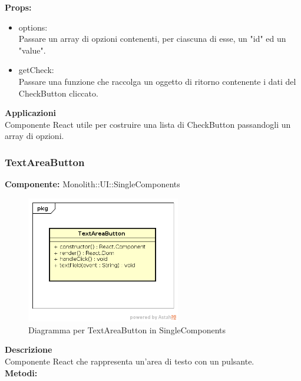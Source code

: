 \textbf{Props:} 
\begin{itemize}
\item options: 
\\
Passare un array di opzioni contenenti, per ciascuna di esse, un "id" ed un "value".
\item getCheck: 
\\
Passare una funzione che raccolga un oggetto di ritorno contenente i dati del CheckButton cliccato.

\end{itemize} 


\textbf{Applicazioni}\\
Componente React utile per costruire una lista di CheckButton passandogli un array di opzioni. 


\clearpage

\subsubsection{TextAreaButton}
\textbf{Componente:}  Monolith::UI::SingleComponents\\
   \FloatBarrier
   \begin{figure}[ht]
   \centering
   \includegraphics[width=0.6\textwidth]{img/single-TextAreaButton.png}
   \caption{{Diagramma per TextAreaButton in SingleComponents}}
\end{figure}
\FloatBarrier
\textbf{Descrizione}\\
Componente React che rappresenta un'area di testo con un pulsante. \\
\textbf{Metodi:} 
